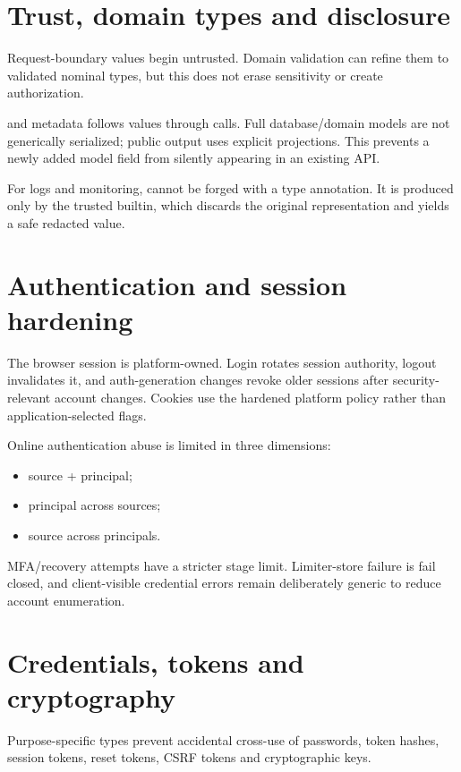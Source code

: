 \section{Trust, domain types and disclosure}

Request-boundary values begin untrusted. Domain validation can refine them to validated nominal types, but this does not erase sensitivity or create authorization.

 and  metadata follows values through calls. Full database/domain models are not generically serialized; public output uses explicit projections. This prevents a newly added model field from silently appearing in an existing API.

For logs and monitoring,  cannot be forged with a type annotation. It is produced only by the trusted  builtin, which discards the original representation and yields a safe redacted value.

\section{Authentication and session hardening}

The browser session is platform-owned. Login rotates session authority, logout invalidates it, and auth-generation changes revoke older sessions after security-relevant account changes. Cookies use the hardened platform policy rather than application-selected flags.

Online authentication abuse is limited in three dimensions:

\begin{itemize}
  \item source + principal;
  \item principal across sources;
  \item source across principals.
\end{itemize}

MFA/recovery attempts have a stricter stage limit. Limiter-store failure is fail closed, and client-visible credential errors remain deliberately generic to reduce account enumeration.

\section{Credentials, tokens and cryptography}

Purpose-specific types prevent accidental cross-use of passwords, token hashes, session tokens, reset tokens, CSRF tokens and cryptographic keys.

